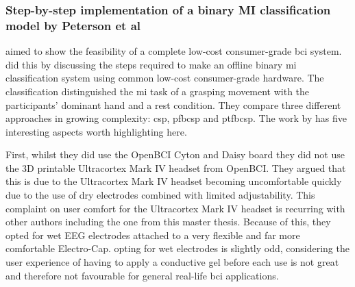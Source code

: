 
\subsubsection{Step-by-step implementation of a binary MI classification model by Peterson et al}
\label{subsubsec:bci_opportunities_obstacles_motivating_examples_binary}

 aimed to show the feasibility of a complete low-cost consumer-grade \gls{bci} system.
 did this by discussing the steps required to make an offline binary \gls{mi} classification system using common low-cost consumer-grade hardware.
The classification distinguished the \gls{mi} task of a grasping movement with the participants' dominant hand and a rest condition.
They compare three different approaches in growing complexity: \gls{csp}, \gls{pfbcsp} and \gls{ptfbcsp}.
The work by \citet{cheap_bci_feasibility} has five interesting aspects worth highlighting here.

First, whilst they did use the OpenBCI Cyton and Daisy board they did not use the 3D printable Ultracortex Mark IV headset from OpenBCI.
They argued that this is due to the Ultracortex Mark IV headset becoming uncomfortable quickly due to the use of dry electrodes combined with limited adjustability.
This complaint on user comfort for the Ultracortex Mark IV headset is recurring with other authors including the one from this master thesis.
Because of this, they opted for wet EEG electrodes attached to a very flexible and far more comfortable Electro-Cap.
  opting for wet electrodes is slightly odd, considering the user experience of having to apply a conductive gel before each use is not great and therefore not favourable for general real-life \gls{bci} applications.

